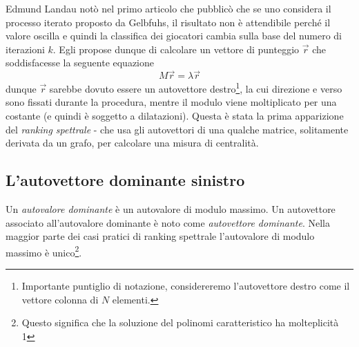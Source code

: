 Edmund Landau \cite{landau} notò nel primo articolo che pubblicò \cite{landaus} che se uno considera il processo iterato proposto da Gelbfuhs, il risultato non è attendibile perché il valore oscilla e quindi la classifica dei giocatori cambia sulla base del numero di iterazioni $k$. Egli propose dunque di calcolare un vettore di punteggio $\vec{r}$ che soddisfacesse la seguente equazione
\begin{equation}
    M\vec{r} = \lambda \vec{r}
\end{equation}
dunque $\vec{r}$ sarebbe dovuto essere un autovettore destro\footnote{Importante puntiglio di
notazione, considereremo l'autovettore destro come il vettore colonna di $N$ elementi.}, la cui direzione e verso sono fissati durante la procedura, mentre il modulo viene moltiplicato per una costante (e quindi è soggetto a dilatazioni). Questa è stata la prima apparizione del \textit{ranking spettrale} - che usa gli autovettori di una qualche matrice, solitamente derivata da un grafo, per calcolare una misura di centralità.
\subsection{L'autovettore dominante sinistro}
Un \textit{autovalore dominante} è un autovalore di modulo massimo. Un autovettore associato all'autovalore dominante è noto come \textit{autovettore dominante}. Nella maggior parte dei casi pratici di ranking spettrale l'autovalore di modulo massimo è unico\footnote{Questo significa che la soluzione del polinomi caratteristico ha molteplicità 1}.

